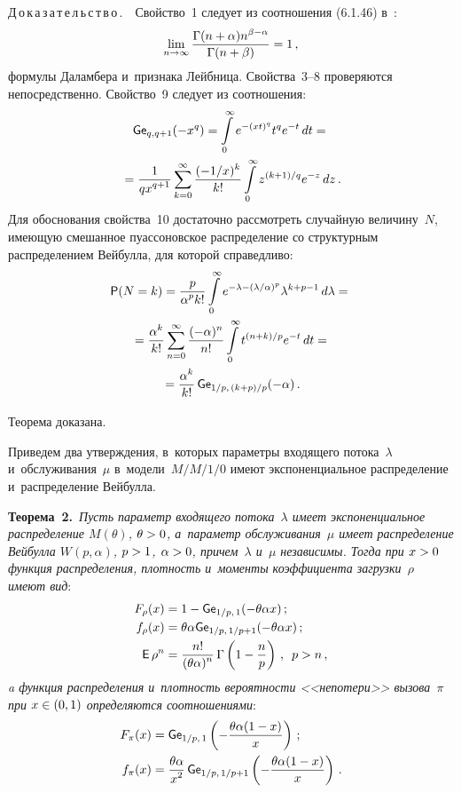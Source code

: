 \begin{multicols}{2}
\noindent
Д\,о\,к\,а\,з\,а\,т\,е\,л\,ь\,с\,т\,в\,о\,.\ \ 
Свойство~1 следует из соотношения (6.1.46) в~\cite{AbSt}:
$$
\lim\limits_{n \to \infty}
\displaystyle\frac{\displaystyle \Gamma(n+\alpha)n^{\beta-\alpha}\mathstrut}{\displaystyle {\Gamma(n+\beta)}\mathstrut}=1\,,
$$
формулы Даламбера и~признака Лейбница.
Свойства~3--8 проверяются непосредственно. Свойство~9 следует из соотношения:
\begin{multline*}
{\sf Ge}_{q, q+1}(-x^q)= \int\limits_0^\infty e^{-(xt)^{q}} t^q e^{-t}\, dt={}\\
{}=
\displaystyle\frac{\displaystyle 1\mathstrut}{\displaystyle {qx^{q+1}}\mathstrut}\sum\limits_{k=0}^\infty
\displaystyle\frac{\displaystyle (-1/x)^k\mathstrut}{\displaystyle {k!}\mathstrut}\int\limits_0^\infty z^{(k+1)/q}e^{-z}\, dz\,.
\end{multline*}
Для обоснования свойства~10 достаточно рас\-смот\-реть случайную величину~$N$, 
имеющую смешанное пуассоновское распределение со структурным распределением 
Вейбулла, для которой справедливо:
\begin{multline*}
{\sf P}(N=k) = \displaystyle\frac{\displaystyle p\mathstrut}{\displaystyle {\alpha^p k!}\mathstrut} \int\limits_0^\infty 
e^{-\lambda -(\lambda/\alpha)^p} \lambda^{k+p-1} \, d\lambda={}\\
{}= \displaystyle\frac{\displaystyle \alpha^k\mathstrut}{\displaystyle k!\mathstrut} \sum\limits_{n=0}^\infty 
\displaystyle\frac{\displaystyle (-\alpha)^n\mathstrut}{\displaystyle {n!}\mathstrut} \int\limits_0^\infty t^{(n+k)/p} e^{-t} \, dt
= {}\\
{}=\displaystyle\frac{\displaystyle \alpha^k\mathstrut}{\displaystyle k!\mathstrut}\, {\sf Ge}_{1/p,\, (k+p)/p}(- \alpha)\,.
\end{multline*}

Теорема доказана.

\smallskip

Приведем два утверждения, в~которых па\-ра\-мет\-ры входящего потока~$\lambda$ 
и~обслуживания~$\mu$ в~модели~$M/M/1/0$ имеют  экспоненциальное распределение 
и~распределение Вейбулла.

\noindent
\textbf{Теорема~2.}\ 
\textit{Пусть параметр входящего потока~$\lambda$ имеет экспоненциальное 
распределение $M(\theta)$, $\theta\hm>0$, а~параметр обслуживания~$\mu$ 
имеет распределение Вейбулла $W(p,\alpha)$, $p\hm>1$, $\alpha\hm>0$, причем~$\lambda$ 
и~$\mu$ независимы. Тогда при $x\hm>0$ функция распределения, плотность 
и~моменты коэффициента загрузки~$\rho$ имеют вид}:
\begin{align*}
F_\rho(x) &= 1 - {\sf Ge}_{1/p,\, 1}(-\theta \alpha x)\,; \\
f_\rho(x) &= \theta \alpha {\sf Ge}_{1/p,\, 1/p+1}(-\theta \alpha x)\,;\\
{\sf E}\,\rho^n &= \displaystyle\frac{\displaystyle n!\mathstrut}{\displaystyle (\theta \alpha)^n\mathstrut}\,\Gamma\left(1-\displaystyle\frac{\displaystyle n\mathstrut}{\displaystyle p\mathstrut}\right)\,, \enskip 
p>n\,,
\end{align*}
\textit{a функция распределения и~плотность вероятности <<непотери>> вызова~$\pi$ 
при $x\hm\in(0,1)$ определяются соотношениями}:
\begin{align*}
F_\pi(x) &= {\sf Ge}_{1/p,\, 1}\left(-\displaystyle\frac{\displaystyle \theta \alpha (1-x)\mathstrut}{\displaystyle x\mathstrut}\right)\,; \\
f_\pi(x) &= \displaystyle\frac{\displaystyle \theta \alpha\mathstrut}{\displaystyle {x^2}\mathstrut}\, {\sf Ge}_{1/p,\, 1/p + 1}
\left(-\displaystyle\frac{\displaystyle \theta \alpha (1-x)\mathstrut}{\displaystyle x\mathstrut}\right)\,.
\end{align*}


\end{multicols}
